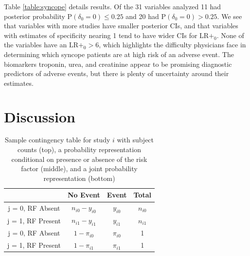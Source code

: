 \documentclass[AMA,STIX1COL]{WileyNJD-v2}
\begin{document}
Table \ref{table:syncope} details results. Of the 31 variables analyzed 11 had posterior probability $\mbox{P}(\delta_0 = 0) \le 0.25$ and 20 had $\mbox{P}(\delta_0 = 0) > 0.25$. We see that variables with more studies have smaller posterior CIs, and that variables with estimates of specificity nearing 1 tend to have wider CIs for LR$+_0$. None of the variables have an $\mbox{LR}+_0 > 6$, which highlights the difficulty physicians face in determining which syncope patients are at high risk of an adverse event. The biomarkers troponin, urea, and creatinine appear to be promising diagnostic predictors of adverse events, but there is plenty of uncertainty around their estimates. 

\section{Discussion}






\clearpage 


\begin{table}[ht]
\centering
\begin{tabular}{c|cc|c}
                           & No Event          & Event       & Total        \\ \hline
j = 0, RF Absent  & $n_{i0} - y_{i0}$ & $y_{i0}$    & $n_{i0}$     \\
j = 1, RF Present & $n_{i1} - y_{i1}$ & $y_{i1}$    & $n_{i1}$     \\ \hline
j = 0, RF Absent & $1 - \pi_{i0}$    & $\pi_{i0}$  & 1            \\
j = 1, RF Present & $1 - \pi_{i1}$    & $\pi_{i1}$  & 1            \\ \hline 
\end{tabular}
\caption{Sample contingency table for study $i$ with subject counts (top), a probability representation conditional on presence or absence of the risk factor (middle), and a joint probability representation (bottom)}
\label{table:RCT_contingency}
\end{table}
\end{document}
